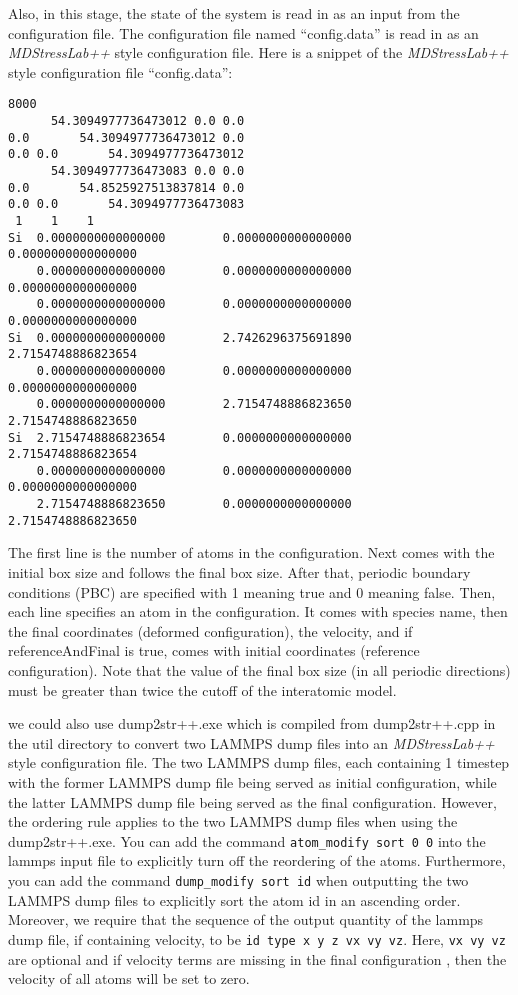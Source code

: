\documentclass[authoryear]{elsarticle}
\newcommand{\ttt}{\texttt}
\newcommand{\MDStressLab}{\emph{MDStressLab++}\xspace}
\begin{document}
Also, in this stage, the state of the system is read in as an input from the configuration file.
The configuration file named ``config.data'' is read in as an 
\MDStressLab style configuration file.
Here is a snippet of the \MDStressLab style configuration file ``config.data'':
\begin{Verbatim}[frame=single]
8000
      54.3094977736473012 0.0 0.0
0.0       54.3094977736473012 0.0
0.0 0.0       54.3094977736473012
      54.3094977736473083 0.0 0.0
0.0       54.8525927513837814 0.0
0.0 0.0       54.3094977736473083
 1    1    1 
Si  0.0000000000000000        0.0000000000000000        0.0000000000000000
    0.0000000000000000        0.0000000000000000        0.0000000000000000
    0.0000000000000000        0.0000000000000000        0.0000000000000000
Si  0.0000000000000000        2.7426296375691890        2.7154748886823654
    0.0000000000000000        0.0000000000000000        0.0000000000000000
    0.0000000000000000        2.7154748886823650        2.7154748886823650
Si  2.7154748886823654        0.0000000000000000        2.7154748886823654
    0.0000000000000000        0.0000000000000000        0.0000000000000000
    2.7154748886823650        0.0000000000000000        2.7154748886823650
\end{Verbatim}
The first line is the number of atoms in the configuration.
Next comes with the initial box size and follows the final box size.
After that, periodic boundary conditions (PBC) are specified with 1 meaning true and 0 meaning false.
Then, each line specifies an atom in the configuration.
It comes with species name, then the final coordinates (deformed configuration), the velocity, and if referenceAndFinal is true,
comes with initial coordinates (reference configuration).
Note that the value of the
final box size (in all periodic directions) must be greater than twice the cutoff of the interatomic model.

we could also use dump2str++.exe which is compiled from dump2str++.cpp
in the util directory to convert two LAMMPS dump files into an 
\MDStressLab style configuration file.
The two LAMMPS dump files, each containing 1 timestep with the former LAMMPS dump file being served as initial configuration,
while the latter LAMMPS dump file being served as the final configuration. 
However, the ordering rule applies to the two LAMMPS dump files when using the dump2str++.exe.
You can add the command \ttt{atom\_modify sort 0 0} into the lammps input file to explicitly turn off the reordering of the atoms.
Furthermore, you can add the command \ttt{dump\_modify sort id} when outputting the two LAMMPS dump files to explicitly sort the atom id in an ascending order.
Moreover, we require that the sequence of the output quantity of the lammps dump file, if containing velocity, to be \ttt{id type x y z vx vy vz}.
Here, \ttt{vx vy vz} are optional and if velocity terms are missing in the final configuration , then the velocity of all atoms will be set to zero.
\end{document}
